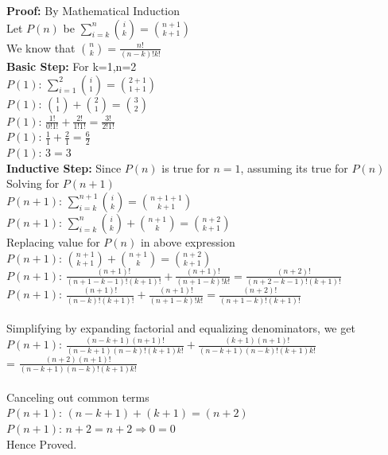 \documentclass[12pt]{article}
\begin{document}
\begin{enumerate}
\begin{enumerate}
\begin{enumerate}
\textbf{Proof:} By Mathematical Induction\\
Let $P(n)$ be $\displaystyle{\sum^{n}_{i=k} {i \choose k} = {n+1 \choose k+1}}$\\
We know that $\displaystyle{{n \choose k} = {\frac{n!}{(n-k)!k!}}}$\\
\textbf{Basic Step:} For k=1,n=2\\
$P(1)$: $\displaystyle{\sum^{2}_{i=1} {i \choose 1} = {2+1 \choose 1+1}}$\\
$P(1)$: $\displaystyle{{1 \choose 1} + {2 \choose 1}  = {3 \choose 2}}$\\
$P(1)$: $\displaystyle{{\frac{1!}{0!1!}}+ {\frac{2!}{1!1!}} = {\frac{3!}{2!1!}}}$\\
$P(1)$: $\displaystyle{{\frac{1}{1}} + {\frac{2}{1}} = {\frac{6}{2}}}$\\
$P(1)$: $ 3 = 3$\\
\textbf{Inductive Step:} Since $P(n)$ is true for $n = 1$, assuming its true for $P(n)$\\
Solving for $P(n+1)$\\
$P(n+1)$: $\displaystyle{\sum^{n+1}_{i=k} {i \choose k} = {n+1+1 \choose k+1}}$\\
$P(n+1)$: $\displaystyle{\sum^{n}_{i=k} {i \choose k} + {n+1 \choose k} = {n+2 \choose k+1}}$\\
Replacing value for $P(n)$ in above expression\\
$P(n+1)$: $\displaystyle{{n+1 \choose k+1} + {n+1 \choose k} = {n+2 \choose k+1}}$\\
$P(n+1)$: $\displaystyle{{\frac{(n+1)!}{(n+1-k-1)!(k+1)!}} + {\frac{(n+1)!}{(n+1-k)!k!}} = {\frac{(n+2)!}{(n+2-k-1)!(k+1)!}}}$\\  
$P(n+1)$: $\displaystyle{{\frac{(n+1)!}{(n-k)!(k+1)!}} + {\frac{(n+1)!}{(n+1-k)!k!}} = {\frac{(n+2)!}{(n+1-k)!(k+1)!}}}$\\\\
Simplifying by expanding factorial and equalizing denominators, we get\\
$P(n+1)$: $\displaystyle{\frac{(n-k+1)(n+1)!}{(n-k+1)(n-k)!(k+1)k!} + \frac{(k+1)(n+1)!}{(n-k+1)(n-k)!(k+1)k!}}$\\ = $\displaystyle{\frac{(n+2)(n+1)!}{(n-k+1)(n-k)!(k+1)k!}}$\\ \\
Canceling out common terms\\
$P(n+1)$: $(n-k+1) + (k+1) = (n+2)$\\
$P(n+1)$: $n+2 = n+2 \Rightarrow 0 = 0$\\
Hence Proved.


\end{enumerate}
\end{enumerate}
\end{enumerate}
\end{document}
